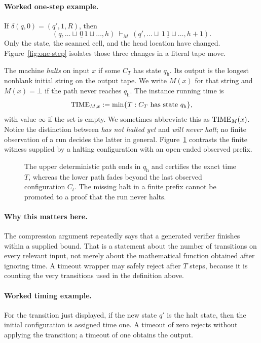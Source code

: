 \paragraph{Worked one-step example.}
If \(\delta(q,0)=(q',1,R)\), then
\[
 (q,\ldots\sqcup\,\underline 0\,1\sqcup\ldots,h)
 \ \vdash_M\ 
 (q',\ldots\sqcup\,1\,\underline 1\sqcup\ldots,h+1).
\]
Only the state, the scanned cell, and the head location have changed.
Figure~\ref{fig:one-step} isolates those three changes in a literal tape move.

The machine \emph{halts} on input \(x\) if some \(C_T\) has state
\(q_{\mathrm h}\).  Its output is the longest nonblank initial string on the
output tape.  We write \(M(x)\) for that string and \(M(x)=\bot\) if the path
never reaches \(q_{\mathrm h}\).  The instance running time is
\[
 \operatorname{TIME}_{M,x}:=\min\{T:C_T\text{ has state }q_{\mathrm h}\},
\]
with value \(\infty\) if the set is empty.  We sometimes abbreviate this as
\(\operatorname{TIME}_M(x)\).  Notice the distinction between \emph{has not halted yet} and
\emph{will never halt}; no finite observation of a run decides the latter in
general.
Figure~\ref{fig:config-path} contrasts the finite witness supplied by a
halting configuration with an open-ended observed prefix.

\begin{figure}[t]
\centering

\caption{The upper deterministic path ends in \(q_{\mathrm h}\) and certifies the exact time \(T\), whereas the lower path fades beyond the last observed configuration \(C_t\).  The missing halt in a finite prefix cannot be promoted to a proof that the run never halts.}
\label{fig:config-path}
\end{figure}

\paragraph{Why this matters here.}
The compression argument repeatedly says that a generated verifier finishes
within a supplied bound.  That is a statement about the number of transitions
on every relevant input, not merely about the mathematical function obtained
after ignoring time.  A timeout wrapper may safely reject after \(T\) steps,
because it is counting the very transitions used in the definition above.

\paragraph{Worked timing example.}
For the transition just displayed, if the new state \(q'\) is the halt state,
then the initial configuration is assigned time one.  A timeout of zero
rejects without applying the transition; a timeout of one obtains the output.

